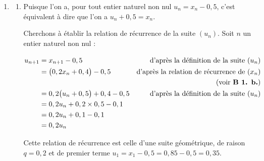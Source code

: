 \begin{enumerate}
\begin{enumerate}

$R_n$ et $\overline{R_n}$ partitionnant l'univers, d'après la loi des probabilités totales, on a :

$\begin{aligned}[t] x_{n+1} &= P(R_{n+1}) \\
&= P\big(R_{n+1} \cap R_n\big)P\big(R_{n+1} \cap \overline{R_n}\big)\\
&= x_n \times 0,6 + (1 - x_n)\times 0,4 \\
&= 0,6 x_n + 0,4 - 0,4x_n \\
&= 0,2x_n + 0,4.\end{aligned}$

On a bien établi la relation de récurrence attendue pour la suite $(x_n)$.
	\end{enumerate}

	\item \begin{enumerate}
		\item Puisque l'on a, pour tout entier naturel non nul $u_n = x_n - 0,5$, c'est équivalent à dire que l'on a $u_n + 0,5 = x_n$.

		Cherchons à établir la relation de récurrence de la suite $(u_n)$. Soit $n$ un entier naturel non nul :

$\begin{aligned}[t] u_{n+1} &= x_{n+1} - 0,5 &\text{d'après la définition de la suite }(u_n)\\
&=\big(0,2 x_n + 0,4\big) -0,5&\text{d'après la relation de récurrence de }(x_n) \\
&&\text{ (voir \textbf{B 1. b.})}\\
&=0,2 \big(u_n + 0,5\big) + 0,4 - 0,5&\text{d'après la définition de la suite }(u_n)\\
&=0,2u_n + 0,2\times 0,5 - 0,1\\
&=0,2u_n + 0,1 - 0,1\\
&=0,2u_n\\ \end{aligned}$

Cette relation de récurrence est celle d'une suite géométrique, de raison $q= 0,2$ et de premier terme $u_1 = x_1 - 0,5 = 0,85 - 0,5 = 0,35$.


\end{enumerate}
\end{enumerate}
